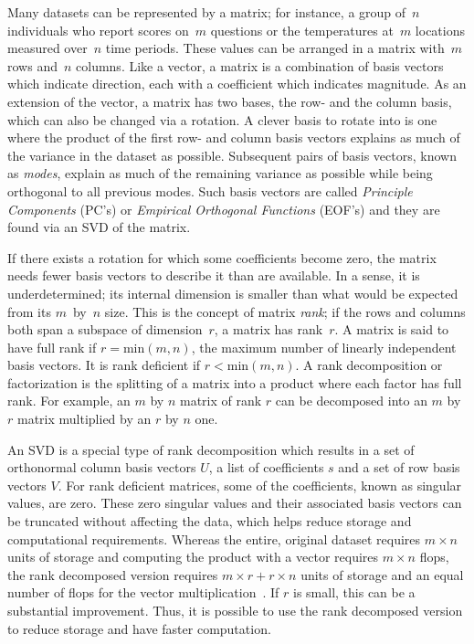 \documentclass[ijgi,article,submit,moreauthors,pdftex,10pt,a4paper]{Definitions/mdpi}
\begin{document}
Many datasets can be represented by a matrix; for instance, a group of~$n$ individuals who report scores on~$m$ questions or the temperatures at~$m$ locations measured over~$n$ time periods. These values can be arranged in a matrix with~$m$ rows and~$n$ columns. Like a vector, a matrix is a combination of basis vectors which indicate direction, each with a coefficient which indicates magnitude. As an extension of the vector, a matrix has two bases, the row- and the column basis, which can also be changed via a rotation. A clever basis to rotate into is one where the product of the first row- and column basis vectors explains as much of the variance in the dataset as possible. Subsequent pairs of basis vectors, known as \textit{modes}, explain as much of the remaining variance as possible while being orthogonal to all previous modes. Such basis vectors are called \textit{Principle Components} (PC's) or \textit{Empirical Orthogonal Functions} (EOF's) and they are found via an SVD of the matrix.

If there exists a rotation for which some coefficients become zero, the matrix needs fewer basis vectors to describe it than are available. In a sense, it is underdetermined; its internal dimension is smaller than what would be expected from its $m$~by~$n$ size. This is the concept of matrix \textit{rank}; if the rows and columns both span a subspace of dimension~$r$, a matrix has rank~$r$. A matrix is said to have full rank if $r = \text{min}(m, n)$, the maximum number of linearly independent basis vectors. It is rank deficient if $r < \text{min}(m, n)$. A rank decomposition or factorization is the splitting of a matrix into a product where each factor has full rank. For example, an $m$ by $n$ matrix of rank $r$ can be decomposed into an $m$ by $r$ matrix multiplied by an $r$ by $n$ one. %

An SVD is a special type of rank decomposition which results in a set of orthonormal column basis vectors $U$, a list of coefficients $s$ and a set of row basis vectors $V$. For rank deficient matrices, some of the coefficients, known as singular values, are zero. These zero singular values and their associated basis vectors can be truncated without affecting the data, which helps reduce storage and computational requirements. Whereas the entire, original dataset requires $m \times n$ units of storage and computing the product with a vector requires $m \times n$ flops, the rank decomposed version requires $m \times r + r \times n$ units of storage and an equal number of flops for the vector multiplication~\cite{Martinsson2016}. If $r$ is small, this can be a substantial improvement. Thus, it is possible to use the rank decomposed version to reduce storage and have faster computation.
\end{document}
